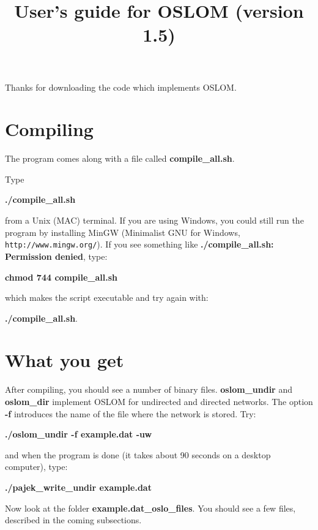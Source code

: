 \documentclass[11pt]{article}
\title{User's guide for OSLOM (version 1.5)}
\begin{document}
\maketitle

Thanks for downloading the code which implements OSLOM.


\section{Compiling}

The program comes along with a file called \textbf{compile\_all.sh}.

Type  

{ \textbf{./compile\_all.sh} }

from a Unix (MAC) terminal. If you are using Windows, you could still run
the program by installing MinGW
(Minimalist GNU for Windows, {\tt http://www.mingw.org/}).
If you see something like \textbf{./compile\_all.sh: Permission denied}, type:

\textbf{chmod 744 compile\_all.sh} 

which makes the script executable and try again with:

\textbf{./compile\_all.sh}. 

\section{What you get}

After compiling, you should see a number of binary
files. \textbf{oslom\_undir} and \textbf{oslom\_dir} 
implement OSLOM for undirected and directed networks. The option {\bf
  -f} introduces the name of the file where the network is stored. Try:

{ \textbf{./oslom\_undir -f example.dat -uw} }

and when the program is done (it takes about 90 seconds on a desktop computer), type: 

{ \textbf{./pajek\_write\_undir example.dat}}

Now look at the folder \textbf{example.dat\_oslo\_files}. You should
see a few files, described in the coming subsections.
\end{document}
